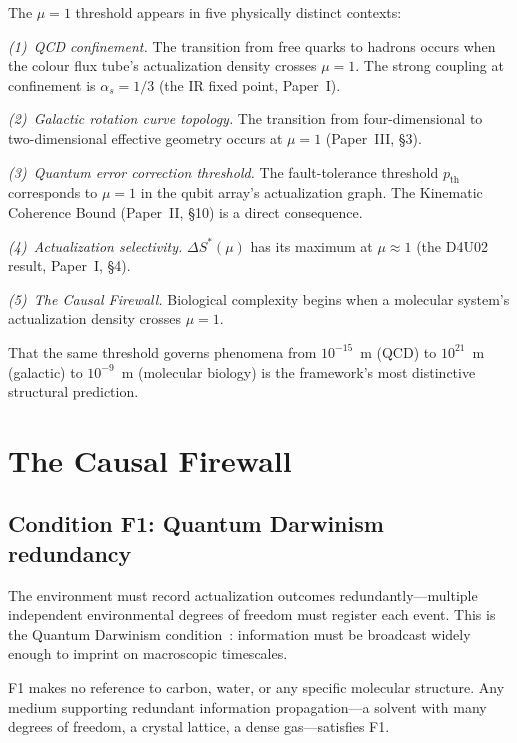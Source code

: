 \documentclass[11pt,a4paper]{article}
\theoremstyle{plain}
\theoremstyle{definition}
\theoremstyle{remark}
\begin{document}
The $\mu = 1$ threshold appears in five physically distinct contexts:

\emph{(1)~QCD confinement.}  The transition from free quarks to hadrons occurs when
the colour flux tube's actualization density crosses $\mu = 1$.  The strong coupling
at confinement is $\alpha_s = 1/3$ (the IR fixed point, Paper~I).

\emph{(2)~Galactic rotation curve topology.}  The transition from four-dimensional to
two-dimensional effective geometry occurs at $\mu = 1$ (Paper~III, \S3).

\emph{(3)~Quantum error correction threshold.}  The fault-tolerance threshold
$p_{\mathrm{th}}$ corresponds to $\mu = 1$ in the qubit array's actualization graph.
The Kinematic Coherence Bound (Paper~II, \S10) is a direct consequence.

\emph{(4)~Actualization selectivity.}  $\Delta S^*(\mu)$ has its maximum at
$\mu \approx 1$ (the D4U02 result, Paper~I, \S4).

\emph{(5)~The Causal Firewall.}  Biological complexity begins when a molecular
system's actualization density crosses $\mu = 1$.

That the same threshold governs phenomena from $10^{-15}$~m (QCD) to
$10^{21}$~m (galactic) to $10^{-9}$~m (molecular biology) is the framework's most
distinctive structural prediction.

\section{The Causal Firewall}\label{sec:firewall}

\subsection{Condition F1: Quantum Darwinism redundancy}\label{sec:f1}

The environment must record actualization outcomes redundantly---multiple independent
environmental degrees of freedom must register each event.  This is the Quantum
Darwinism condition~\cite{Zurek2009}: information must be broadcast widely enough to
imprint on macroscopic timescales.

F1 makes no reference to carbon, water, or any specific molecular structure.  Any
medium supporting redundant information propagation---a solvent with many degrees of
freedom, a crystal lattice, a dense gas---satisfies F1.
\end{document}
